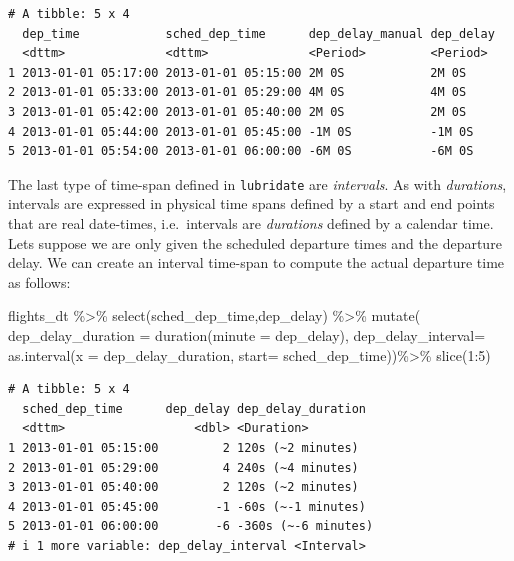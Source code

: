 \documentclass[
  letterpaper,
  DIV=11,
  numbers=noendperiod]{scrartcl}
\newenvironment{Shaded}{\begin{snugshade}}{\end{snugshade}}
\newcommand{\AttributeTok}[1]{\textcolor[rgb]{0.40,0.45,0.13}{#1}}
\newcommand{\DecValTok}[1]{\textcolor[rgb]{0.68,0.00,0.00}{#1}}
\newcommand{\FunctionTok}[1]{\textcolor[rgb]{0.28,0.35,0.67}{#1}}
\newcommand{\NormalTok}[1]{\textcolor[rgb]{0.00,0.23,0.31}{#1}}
\newcommand{\SpecialCharTok}[1]{\textcolor[rgb]{0.37,0.37,0.37}{#1}}
\begin{document}
\begin{verbatim}
# A tibble: 5 x 4
  dep_time            sched_dep_time      dep_delay_manual dep_delay
  <dttm>              <dttm>              <Period>         <Period> 
1 2013-01-01 05:17:00 2013-01-01 05:15:00 2M 0S            2M 0S    
2 2013-01-01 05:33:00 2013-01-01 05:29:00 4M 0S            4M 0S    
3 2013-01-01 05:42:00 2013-01-01 05:40:00 2M 0S            2M 0S    
4 2013-01-01 05:44:00 2013-01-01 05:45:00 -1M 0S           -1M 0S   
5 2013-01-01 05:54:00 2013-01-01 06:00:00 -6M 0S           -6M 0S   
\end{verbatim}

The last type of time-span defined in \texttt{lubridate} are
\emph{intervals}. As with \emph{durations}, intervals are expressed in
physical time spans defined by a start and end points that are real
date-times, i.e.~intervals are \emph{durations} defined by a calendar
time. Lets suppose we are only given the scheduled departure times and
the departure delay. We can create an interval time-span to compute the
actual departure time as follows:

\begin{Shaded}
\begin{Highlighting}[]
\NormalTok{flights\_dt }\SpecialCharTok{\%\textgreater{}\%}
  \FunctionTok{select}\NormalTok{(sched\_dep\_time,dep\_delay) }\SpecialCharTok{\%\textgreater{}\%}
  \FunctionTok{mutate}\NormalTok{(}
      \AttributeTok{dep\_delay\_duration =} \FunctionTok{duration}\NormalTok{(}\AttributeTok{minute  =}\NormalTok{ dep\_delay),}
      \AttributeTok{dep\_delay\_interval=} \FunctionTok{as.interval}\NormalTok{(}\AttributeTok{x =}\NormalTok{ dep\_delay\_duration, }\AttributeTok{start=}\NormalTok{ sched\_dep\_time))}\SpecialCharTok{\%\textgreater{}\%}
  \FunctionTok{slice}\NormalTok{(}\DecValTok{1}\SpecialCharTok{:}\DecValTok{5}\NormalTok{)}
\end{Highlighting}
\end{Shaded}

\begin{verbatim}
# A tibble: 5 x 4
  sched_dep_time      dep_delay dep_delay_duration 
  <dttm>                  <dbl> <Duration>         
1 2013-01-01 05:15:00         2 120s (~2 minutes)  
2 2013-01-01 05:29:00         4 240s (~4 minutes)  
3 2013-01-01 05:40:00         2 120s (~2 minutes)  
4 2013-01-01 05:45:00        -1 -60s (~-1 minutes) 
5 2013-01-01 06:00:00        -6 -360s (~-6 minutes)
# i 1 more variable: dep_delay_interval <Interval>
\end{verbatim}
\end{document}
